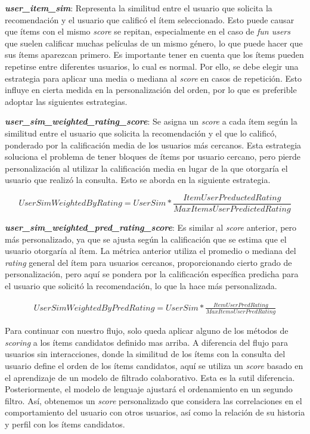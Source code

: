 \documentclass[11pt,a4paper,twoside]{thesis}
\begin{document}
\textbf{\textit{user\_item\_sim}}: Representa la similitud entre el usuario que solicita la recomendación y el usuario que calificó el ítem seleccionado. Esto puede causar que ítems con el mismo \textit{score} se repitan, especialmente en el caso de \textit{fun users} que suelen calificar muchas películas de un mismo género, lo que puede hacer que sus ítems aparezcan primero. Es importante tener en cuenta que los ítems pueden repetirse entre diferentes usuarios, lo cual es normal. Por ello, se debe elegir una estrategia para aplicar una media o mediana al \textit{score} en casos de repetición. Esto influye en cierta medida en la personalización del orden, por lo que es preferible adoptar las siguientes estrategias.

\textbf{\textit{user\_sim\_weighted\_rating\_score}}: Se asigna un \textit{score} a cada ítem según la similitud entre el usuario que solicita la recomendación y el que lo calificó, ponderado por la calificación media de los usuarios más cercanos. Esta estrategia soluciona el problema de tener bloques de ítems por usuario cercano, pero pierde personalización al utilizar la calificación media en lugar de la que otorgaría el usuario que realizó la consulta. Esto se aborda en la siguiente estrategia.

\begin{equation}
	User Sim Weighted By Rating = User Sim * \frac{Item User Preducted Rating}{Max Items User Predicted Rating}
\end{equation}

\textbf{\textit{user\_sim\_weighted\_pred\_rating\_score}}: Es similar al \textit{score} anterior, pero más personalizado, ya que se ajusta según la calificación que se estima que el usuario otorgaría al ítem. La métrica anterior utiliza el promedio o mediana del \textit{rating} general del ítem para usuarios cercanos, proporcionando cierto grado de personalización, pero aquí se pondera por la calificación específica predicha para el usuario que solicitó la recomendación, lo que la hace más personalizada.

\begin{align}
	User Sim Weighted By Pred Rating = User Sim * \frac{Item User Pred Rating}{Max Items User Pred Rating}
\end{align}

Para continuar con nuestro flujo, solo queda aplicar alguno de los métodos de \textit{scoring} a los ítems candidatos definido mas arriba. A diferencia del flujo para usuarios sin interacciones, donde la similitud de los ítems con la consulta del usuario define el orden de los ítems candidatos, aquí se utiliza un \textit{score} basado en el aprendizaje de un modelo de filtrado colaborativo. Esta es la sutil diferencia. Posteriormente, el modelo de lenguaje ajustará el ordenamiento en un segundo filtro. Así, obtenemos un \textit{score} personalizado que considera las correlaciones en el comportamiento del usuario con otros usuarios, así como la relación de su historia y perfil con los ítems candidatos.
\end{document}
